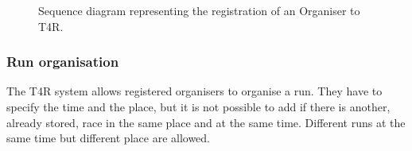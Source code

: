             \begin{figure}[H]
                \centering
                \caption{Sequence diagram representing the registration of an Organiser to T4R.}
                \label{fig:Organiser-registration-sequence-diagram}
            \end{figure}
            
        \subsubsection{Run organisation}
            
            The T4R system allows registered organisers to organise a run. They have to specify the time and the place, but it is not possible to add if there is another, already stored, race in the same place and at the same time. Different runs at the same time but different place are allowed.
            
